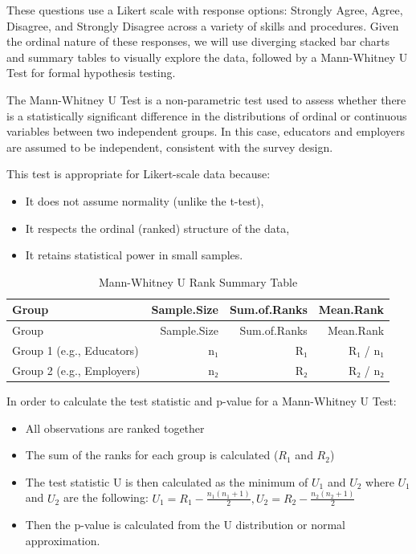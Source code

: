 \documentclass[
  11pt,
  letterpaper,
  DIV=11,
  numbers=noendperiod]{scrartcl}
\providecommand{\tightlist}{%
  \setlength{\itemsep}{0pt}\setlength{\parskip}{0pt}}\usepackage{longtable,booktabs,array}
\numberwithin{figure}{section}
\begin{document}
These questions use a Likert scale with response options: Strongly
Agree, Agree, Disagree, and Strongly Disagree across a variety of skills
and procedures. Given the ordinal nature of these responses, we will use
diverging stacked bar charts and summary tables to visually explore the
data, followed by a Mann-Whitney U Test for formal hypothesis testing.

The Mann-Whitney U Test is a non-parametric test used to assess whether
there is a statistically significant difference in the distributions of
ordinal or continuous variables between two independent groups. In this
case, educators and employers are assumed to be independent, consistent
with the survey design.

This test is appropriate for Likert-scale data because:

\begin{itemize}
\tightlist
\item
  It does not assume normality (unlike the t-test),
\item
  It respects the ordinal (ranked) structure of the data,
\item
  It retains statistical power in small samples.
\end{itemize}

\begin{longtable}[]{@{}lrrr@{}}
\caption{Mann-Whitney U Rank Summary Table}\tabularnewline
\toprule\noalign{}
Group & Sample.Size & Sum.of.Ranks & Mean.Rank \\
\midrule\noalign{}
\endfirsthead
\toprule\noalign{}
Group & Sample.Size & Sum.of.Ranks & Mean.Rank \\
\midrule\noalign{}
\endhead
\bottomrule\noalign{}
\endlastfoot
Group 1 (e.g., Educators) & n₁ & R₁ & R₁ / n₁ \\
Group 2 (e.g., Employers) & n₂ & R₂ & R₂ / n₂ \\
\end{longtable}

In order to calculate the test statistic and p-value for a Mann-Whitney
U Test:

\begin{itemize}
\tightlist
\item
  All observations are ranked together
\item
  The sum of the ranks for each group is calculated (\(R_1\) and
  \(R_2\))
\item
  The test statistic U is then calculated as the minimum of \(U_1\) and
  \(U_2\) where \(U_1\) and \(U_2\) are the following:
  \(U_1 = R_1 - \frac{n_1(n_1 + 1)}{2}, U_2 = R_2 - \frac{n_2(n_2 + 1)}{2}\)
\item
  Then the p-value is calculated from the U distribution or normal
  approximation.
\end{itemize}
\end{document}

